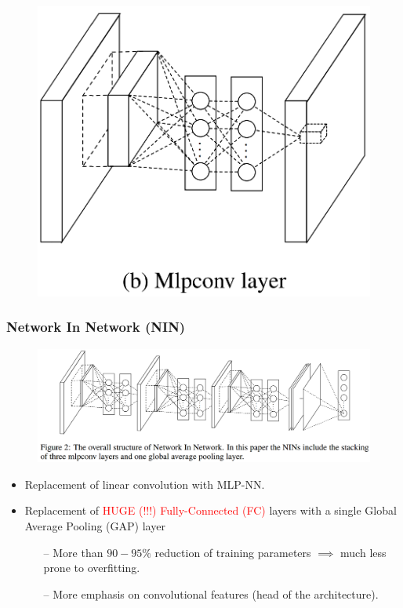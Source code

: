 \documentclass[9pt]{beamer}
\begin{document}
\begin{frame}
\begin{figure}
		\includegraphics[scale=0.15]{./figures/edit/nin_02.png} \\			
	\end{figure}		
\end{frame}

\begin{frame}
	\frametitle{Network In Network (NIN)}
	\begin{figure}
		\includegraphics[scale=0.2]{./figures/edit/nin_03.png} 				
	\end{figure}
		\begin{itemize}
			\item Replacement of linear convolution with MLP-NN.
			\item Replacement of \textcolor{red}{HUGE (!!!) Fully-Connected (FC)} layers with a single \textcolor{green!70!black}{Global Average Pooling (GAP)} layer
				\begin{itemize}
					\item[--] More than $90-95\%$ reduction of training parameters $\implies$ much less prone to overfitting.
					\item[--] More emphasis on convolutional features (head of the architecture).
				\end{itemize} 
		\end{itemize}	
\end{frame}
\end{document}
